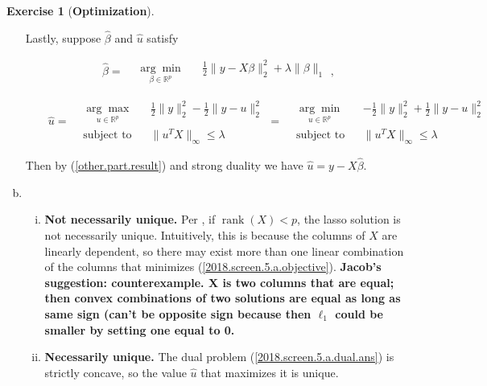 \documentclass{article}
\theoremstyle{definition}
\newtheorem{exercise}{Exercise}
\theoremstyle{definition}
\theoremstyle{definition}
\theoremstyle{definition}
\theoremstyle{definition}
\begin{document}
\begin{exercise}[\textbf{Optimization}]
\begin{enumerate}[(a)]
Lastly, suppose \(\hat{\beta}\) and \(\hat{u}\) satisfy

\[
\hat{\beta} = 
\begin{aligned}
& \underset{\beta \in \mathbb{R}^p}{\arg \min}
& & \frac{1}{2} \lVert y - X \beta \rVert_2^2 + \lambda \lVert \beta \rVert_1
\end{aligned},
\]

\[
 \qquad \hat{u} = 
\begin{aligned}
& \underset{u \in \mathbb{R}^p}{\arg \max}
& & \frac{1}{2} \lVert y \rVert_2^2 - \frac{1}{2} \lVert y - u \rVert_2^2  \\
& \text{subject to}
& & \lVert u^TX \rVert_\infty \leq \lambda
\end{aligned} = 
\begin{aligned}
& \underset{u \in \mathbb{R}^p}{\arg \min}
& & -\frac{1}{2} \lVert y \rVert_2^2 + \frac{1}{2} \lVert y - u \rVert_2^2  \\
& \text{subject to}
& & \lVert u^TX \rVert_\infty \leq \lambda
\end{aligned}
\]

Then by (\ref{other.part.result}) and strong duality we have \(\hat{u} = y - X \hat{\beta}\).

\item

\begin{enumerate}[(i)]

\item \textbf{Not necessarily unique.} Per \citet{Tibshirani2013}, if \(\operatorname{rank}(X) < p\), the lasso solution is not necessarily unique. Intuitively, this is because the columns of \(X\) are linearly dependent, so there may exist more than one linear combination of the columns that minimizes (\ref{2018.screen.5.a.objective}). \textbf{Jacob's suggestion: counterexample. X is two columns that are equal; then convex combinations of two solutions are equal as long as same sign (can't be opposite sign because then \(\ell_1\) could be smaller by setting one equal to 0.}

\item \textbf{Necessarily unique.} The dual problem (\ref{2018.screen.5.a.dual.ans}) is strictly concave, so the value \(\hat{u}\) that maximizes it is unique.



\end{enumerate}
\end{enumerate}
\end{exercise}
\end{document}
